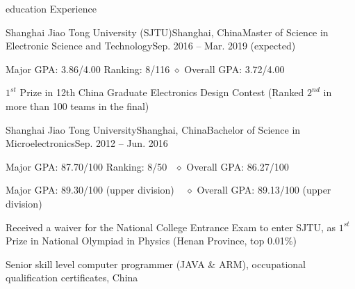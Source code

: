 \documentclass{resume_ucla} %
\begin{document}

\begin{rSection}{education Experience}
\begin{rSubsection}{Shanghai Jiao Tong University (SJTU)}{Shanghai, China}{Master of Science in Electronic Science and Technology}{Sep. 2016 -- Mar. 2019 (expected)}
\item Major GPA: 3.86/4.00 \qquad Ranking: 8/116 \qquad $\diamond$ Overall GPA: 3.72/4.00
\item $1^{st}$ Prize in 12th China Graduate Electronics Design Contest (Ranked $2^{nd}$ in more than 100 teams in the final)
\end{rSubsection}
\begin{rSubsection}{Shanghai Jiao Tong University}{Shanghai, China}{Bachelor of Science in Microelectronics}{Sep. 2012 -- Jun. 2016}
\item Major GPA: 87.70/100 \qquad Ranking: 8/50 \qquad \ $\diamond$ Overall GPA: 86.27/100
\item Major GPA: 89.30/100 (upper division)\ \ \;\,\qquad\quad$\diamond$ Overall GPA: 89.13/100 (upper division)
\item Received a waiver for the National College Entrance Exam to enter SJTU, as $1^{st}$ Prize in National Olympiad in Physics (Henan Province, top 0.01$\%$)
\item Senior skill level computer programmer (JAVA \& ARM), occupational qualification certificates, China
\end{rSubsection}

\begin{comment}
\textbf{Shanghai Jiao Tong University (SJTU), Shanghai}
\\\emph{Master of Science in Electronic Science and Technology} \hfill \emph{Sep. 2016 -- Mar. 2019(expected)}
\\\bm{$\diamond$} Major GPA: 3.86/4.00 \qquad Ranking: 8/116 \qquad $\diamond$ Overall GPA: 3.72/4.00
\\\bm{$\diamond$} $1^{st}$ Prize in 12th China Graduate Electronics Design Contest (Ranked $2^{nd}$ in more than 100 teams in the final)
\\\emph{Bachelor of Science in Microelectronics} \hfill \emph{Sep. 2012 -- Jun. 2016}
\\\bm{$\diamond$} Major GPA: 87.70/100 \qquad Ranking: 8/50 \qquad \ $\diamond$ Overall GPA: 86.27/100
\\\bm{$\diamond$} Major GPA: 89.30/100(upper division) \qquad \qquad$\diamond$ Overall GPA: 89.13/100(upper division)
\\\bm{$\diamond$} Received a waiver for the National College Entrance Exam to enter SJTU, as $1^{st}$ Prize in National Olympiad in Physics (Henan Province, top 0.01$\%$)
\end{comment}

\end{rSection}
\end{document}
